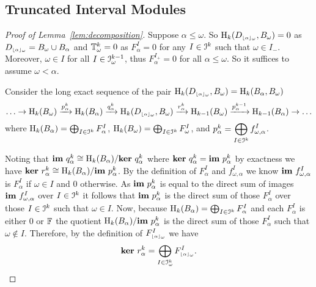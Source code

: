 \subsection{Truncated Interval Modules}

\begin{proof}[Proof of Lemma~\ref{lem:decomposition}]
  Suppose $\alpha\leq\omega$.
  So $\mathrm{H}_k(D_{\scriptscriptstyle \lfloor\alpha\rfloor_{\omega}}, B_\omega) = 0$ as $D_{\scriptscriptstyle \lfloor\alpha\rfloor_{\omega}} = B_\omega\cup B_\alpha$ and $\mathbb{T}^k_\omega = 0$ as $F_\alpha^I = 0$ for any $I\in \mathcal{I}^k$ such that $\omega\in I_-$.
  Moreover, $\omega\in I$ for all $I\in \mathcal{I}_\omega^{k-1}$, thus $F_\alpha^{I_+} = 0$ for all $\alpha\leq\omega$.
  So it suffices to assume $\omega < \alpha$.

  Consider the long exact sequence of the pair $\mathrm{H}_k(D_{\scriptscriptstyle \lfloor\alpha\rfloor_{\omega}}, B_\omega) = \mathrm{H}_k(B_\alpha, B_\omega)$
  \[ \ldots\to \mathrm{H}_k(B_\omega)\xrightarrow{p_\alpha^k} \mathrm{H}_k(B_\alpha)\xrightarrow{q_\alpha^k}\mathrm{H}_k(D_{\scriptscriptstyle \lfloor\alpha\rfloor_{\omega}}, B_\omega)\xrightarrow{r_\alpha^k} \mathrm{H}_{k-1}(B_\omega)\xrightarrow{p_\alpha^{k-1}}\mathrm{H}_{k-1}(B_\alpha)\to\ldots\]
  where $\mathrm{H}_k(B_\alpha) = \bigoplus_{I\in \mathcal{I}^k}F_\alpha^I$, $\mathrm{H}_k(B_\omega) = \bigoplus_{I\in \mathcal{I}^k}F_\omega^I$, and $p_\alpha^k = \displaystyle\bigoplus_{I\in\mathcal{I}^k} f_{\omega,\alpha}^I$.

  Noting that $\mathbf{im}~q_\alpha^k \cong \mathrm{H}_k(B_\alpha) / \mathbf{ker}~q_\alpha^k$ where $\mathbf{ker}~q_\alpha^k = \mathbf{im}~p_\alpha^k$ by exactness we have $\mathbf{ker}~r_\alpha^k \cong \mathrm{H}_k(B_\alpha) / \mathbf{im}~p_\alpha^k$.
  By the definition of $F_\alpha^I$ and $f_{\omega,\alpha}^I$ we know $\mathbf{im}~f_{\omega,\alpha}^I$ is $F_\alpha^I$ if $\omega\in I$ and 0 otherwise.
  As $\mathbf{im}~p_\alpha^k$ is equal to the direct sum of images $\mathbf{im}~f_{\omega,\alpha}^I$ over $I\in\mathcal{I}^k$ it follows that $\mathbf{im}~p_\alpha^k$ is the direct sum of those $F_\alpha^I$ over those $I\in\mathcal{I}^k$ such that $\omega\in I$.
  Now, because $\mathrm{H}_k(B_\alpha) = \bigoplus_{I\in \mathcal{I}^k}F_\alpha^I$ and each $F_\alpha^I$ is either 0 or $\mathbb{F}$ the quotient $\mathrm{H}_k(B_\alpha) / \mathbf{im}~p_\alpha^k$ is the direct sum of those $F_\alpha^I$ such that $\omega\notin I$.
  Therefore, by the definition of $F_{\scriptscriptstyle \lfloor\alpha\rfloor_{\omega}}^I$ we have
  \[ \mathbf{ker}~r_\alpha^k = \bigoplus_{I\in\mathcal{I}_\omega^k} F_{\scriptscriptstyle \lfloor\alpha\rfloor_{\omega}}^I.\]


\end{proof}
